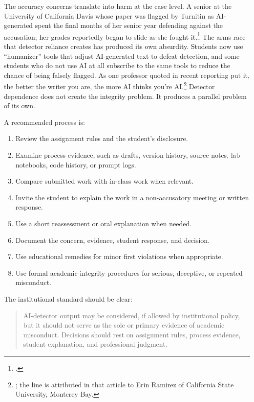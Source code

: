 \documentclass{SIAMbook2023}
\begin{document}
The accuracy concerns translate into harm at the case level. A senior at the University of California Davis whose paper was flagged by Turnitin as AI-generated spent the final months of her senior year defending against the accusation; her grades reportedly began to slide as she fought it.\footnote{\citet{klee2023falsely}.} The arms race that detector reliance creates has produced its own absurdity. Students now use ``humanizer'' tools that adjust AI-generated text to defeat detection, and some students who do not use AI at all subscribe to the same tools to reduce the chance of being falsely flagged. As one professor quoted in recent reporting put it, the better the writer you are, the more AI thinks you're AI.\footnote{\citet{kingkade2026avoid}; the line is attributed in that article to Erin Ramirez of California State University, Monterey Bay.} Detector dependence does not create the integrity problem. It produces a parallel problem of its own.

A recommended process is:

\begin{enumerate}
  \item Review the assignment rules and the student's disclosure.
  \item Examine process evidence, such as drafts, version history, source notes, lab notebooks, code history, or prompt logs.
  \item Compare submitted work with in-class work when relevant.
  \item Invite the student to explain the work in a non-accusatory meeting or written response.
  \item Use a short reassessment or oral explanation when needed.
  \item Document the concern, evidence, student response, and decision.
  \item Use educational remedies for minor first violations when appropriate.
  \item Use formal academic-integrity procedures for serious, deceptive, or repeated misconduct.
\end{enumerate}

The institutional standard should be clear:

\begin{quote}
AI-detector output may be considered, if allowed by institutional policy, but it should not serve as the sole or primary evidence of academic misconduct. Decisions should rest on assignment rules, process evidence, student explanation, and professional judgment.
\end{quote}
\end{document}
